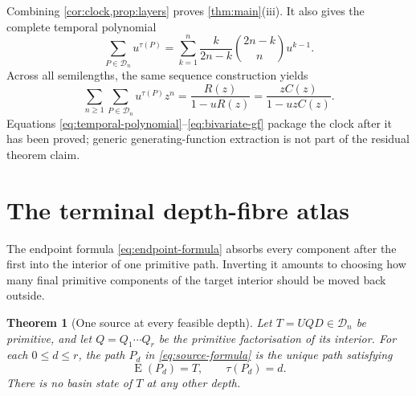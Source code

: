 \documentclass[10pt,a4paper]{amsart}
\newtheorem{theorem}{Theorem}[section]
\theoremstyle{definition}
\theoremstyle{remark}
\newcommand{\Dyck}{\mathcal D}
\newcommand{\End}{\operatorname E}
\begin{document}
Combining \cref{cor:clock,prop:layers} proves
\cref{thm:main}(iii).  It also gives the complete temporal polynomial
\begin{equation}\label{eq:temporal-polynomial}
 \sum_{P\in\Dyck_n}u^{\tau(P)}
   =\sum_{k=1}^{n}\frac{k}{2n-k}\binom{2n-k}{n}u^{k-1}.
\end{equation}
Across all semilengths, the same sequence construction yields
\begin{equation}\label{eq:bivariate-gf}
 \sum_{n\geq1}\sum_{P\in\Dyck_n}u^{\tau(P)}z^n
                  =\frac{R(z)}{1-uR(z)}
                  =\frac{zC(z)}{1-uzC(z)}.
\end{equation}
Equations \eqref{eq:temporal-polynomial}--\eqref{eq:bivariate-gf} package the
clock after it has been proved; generic generating-function extraction is not
part of the residual theorem claim.

\section{The terminal depth-fibre atlas}\label{sec:fibres}

The endpoint formula \eqref{eq:endpoint-formula} absorbs every component after
the first into the interior of one primitive path.  Inverting it amounts to
choosing how many final primitive components of the target interior should be
moved back outside.

\begin{theorem}[One source at every feasible depth]\label{thm:fibres}
Let $T=UQD\in\Dyck_n$ be primitive, and let
$Q=Q_1\cdots Q_r$ be the primitive factorisation of its interior.  For each
$0\leq d\leq r$, the path $P_d$ in \eqref{eq:source-formula} is the unique
path satisfying
\[
                            \End(P_d)=T,
                    \qquad \tau(P_d)=d.
\]
There is no basin state of $T$ at any other depth.
\end{theorem}
\end{document}
